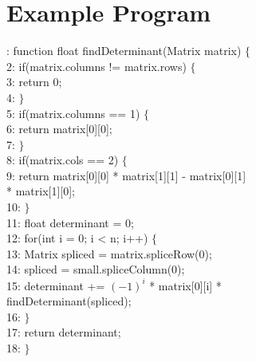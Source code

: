 \documentclass[12pt]{article}
\begin{document}
\section{Example Program}
{: function float findDeterminant(Matrix matrix) $\{$\\
2:    \hspace*{1cm}if(matrix.columns != matrix.rows) $\{$\\
3:        \hspace*{2cm}return 0;\\
4:    \hspace*{1cm}$\}$\\
5:   \hspace*{1cm}if(matrix.columns == 1) $\{$\\
6:       \hspace*{2cm}return matrix[0][0];\\
7:  \hspace*{1cm}$\}$\\
8:    \hspace*{1cm}if(matrix.cols == 2) $\{$\\
9:        \hspace*{2cm}return matrix[0][0] * matrix[1][1] - matrix[0][1] \\
\hspace*{4cm}* matrix[1][0];\\
10: \hspace*{1cm}$\}$\\
11:    \hspace*{1cm}float determinant = 0;\\
12:    \hspace*{1cm}for(int i = 0; i < n; i++) $\{$\\
13:      \hspace*{2cm}Matrix spliced = matrix.spliceRow(0);\\
14:      \hspace*{2cm}spliced = small.spliceColumn(0);\\
15:      \hspace*{2cm}determinant += $(-1)^i$ * matrix[0][i] * \\
\hspace*{4cm}findDeterminant(spliced);\\
16: \hspace*{1cm}$\}$\\
17:    \hspace*{1cm}return determinant;\\
18: $\}$\\
}
\end{document}
